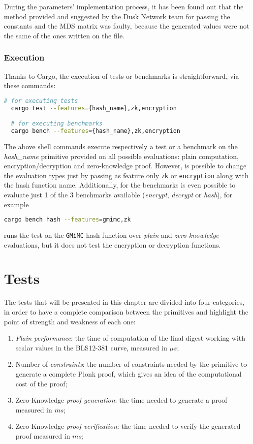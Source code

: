 \documentclass[12pt, a4paper]{report}
\begin{document}
\begin{note}
  During the parameters' implementation process, it has been found out that the method provided and suggested by the Dusk Network team for passing the constants and the MDS matrix was faulty, because the generated values were not the same of the ones written on the file.
\end{note}

\subsection{Execution}\label{subsec:execution}

Thanks to Cargo, the execution of tests or benchmarks is straightforward, via these commands:
\begin{lstlisting}[language=bash]
  # for executing tests
  cargo test --features={hash_name},zk,encryption

  # for executing benchmarks
  cargo bench --features={hash_name},zk,encryption
\end{lstlisting}
The above shell commands execute respectively a test or a benchmark on the \textit{hash\_name} primitive provided on all possible evaluations: plain computation, encryption/decryption and zero-knowledge proof.
However, is possible to change the evaluation types just by passing as feature only \texttt{zk} or \texttt{encryption} along with the hash function name.
Additionally, for the benchmarks is even possible to evaluate just 1 of the 3 benchmarks available (\textit{encrypt}, \textit{decrypt} or \textit{hash}), for example
\begin{lstlisting}[language=bash]
  cargo bench hash --features=gmimc,zk
\end{lstlisting}
runs the test on the \texttt{GMiMC} hash function over \textit{plain} and \textit{zero-knowledge} evaluations, but it does not test the encryption or decryption functions.

\chapter{Tests}\label{chap:tests}

The tests that will be presented in this chapter are divided into four categories, in order to have a complete comparison between the primitives and highlight the point of strength and weakness of each one:
\begin{enumerate}
  \item \textit{Plain performance}: the time of computation of the final digest working with scalar values in the BLS12-381 curve, measured in $\mu s$;
  \item Number of \textit{constraints}: the number of constraints needed by the primitive to generate a complete \textsf{Plonk} proof, which gives an idea of the computational cost of the proof;
  \item Zero-Knowledge \textit{proof generation}: the time needed to generate a proof measured in $ms$;
  \item Zero-Knowledge \textit{proof verification}: the time needed to verify the generated proof measured in $ms$;
\end{enumerate}
\end{document}
